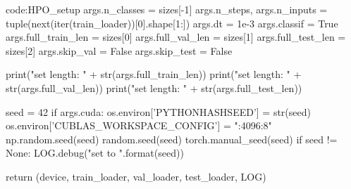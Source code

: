 \begin{mycodebox}{code:HPO_setup}
        args.n_classes                  = sizes[-1]
        args.n_steps, args.n_inputs     = tuple(next(iter(train_loader))[0].shape[1:])
        args.dt                         = 1e-3
        args.classif                    = True
        args.full_train_len             = sizes[0]
        args.full_val_len               = sizes[1]
        args.full_test_len              = sizes[2]
        args.skip_val                   = False
        args.skip_test                  = False

        print("\ttraining set length: " + str(args.full_train_len))
        print("\tvalidation set length: " + str(args.full_val_len))
        print("\ttest set length: " + str(args.full_test_len))

        seed = 42
        if args.cuda:
            os.environ['PYTHONHASHSEED'] = str(seed)
            os.environ['CUBLAS_WORKSPACE_CONFIG'] = ":4096:8"
        np.random.seed(seed)
        random.seed(seed)
        torch.manual_seed(seed)
        if seed != None:
            LOG.debug("\nSeed set to {}\n".format(seed))

        return (device, train_loader, val_loader, test_loader, LOG)
\end{mycodebox}


